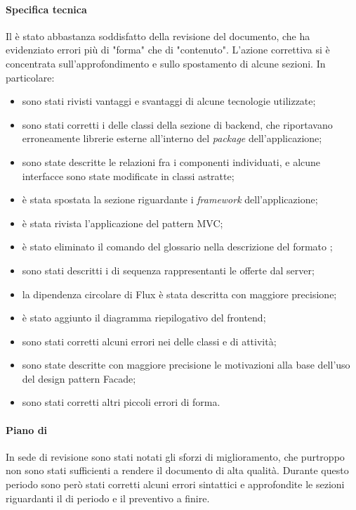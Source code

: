 \paragraph*{Specifica tecnica}
Il  è stato abbastanza soddisfatto della revisione del documento, che ha evidenziato errori più di "forma" che di "contenuto". L'azione correttiva si è concentrata sull'approfondimento e sullo spostamento di alcune sezioni. In particolare:
\begin{itemize}
\item sono stati rivisti vantaggi e svantaggi di alcune tecnologie utilizzate;
\item sono stati corretti i  delle classi della sezione di backend, che riportavano erroneamente librerie esterne all'interno del \textit{package} dell'applicazione;
\item sono state descritte le relazioni fra i componenti individuati, e alcune interfacce sono state modificate in classi astratte;
\item è stata spostata la sezione riguardante i \textit{framework} dell'applicazione;
\item è stata rivista l'applicazione del pattern MVC;
\item è stato eliminato il comando del glossario nella descrizione del formato ;
\item sono stati descritti i  di sequenza rappresentanti le  offerte dal server;
\item la dipendenza circolare di Flux è stata descritta con maggiore precisione;
\item è stato aggiunto il diagramma riepilogativo del frontend;
\item sono stati corretti alcuni errori nei  delle classi e di attività;
\item sono state descritte con maggiore precisione le motivazioni alla base dell'uso del design pattern Facade;
\item sono stati corretti altri piccoli errori di forma.
\end{itemize}

\paragraph*{Piano di }
In sede di revisione sono stati notati gli sforzi di miglioramento, che purtroppo non sono stati sufficienti a rendere il documento di alta qualità. Durante questo periodo sono però stati corretti alcuni errori sintattici e approfondite le sezioni riguardanti il  di periodo e il preventivo a finire.

